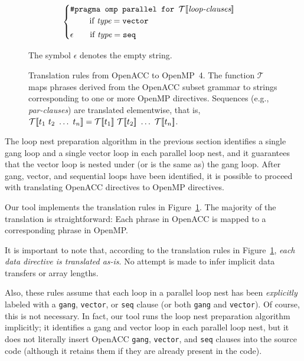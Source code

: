 \documentclass{sig-alternate-05-2015}
\begin{document}
\begin{figure*}
\begin{align*}
\begin{cases}
   \texttt{\#pragma omp parallel for\ }\translate{\textit{loop-clauses}} \\
        \hspace*{2em} \textup{ if $\textit{type} = \texttt{vector}$} \vspace*{.25em} \\
   \epsilon
        \hspace*{1.65em} \textup{ if $\textit{type} = \texttt{seq}$} \\
   \end{cases} \\
%
\end{align*}
\caption{Translation rules from OpenACC to OpenMP~4.  The function
$\mathcal{T}$ maps phrases derived from the OpenACC subset grammar to
strings corresponding to one or more OpenMP directives.  Sequences
(e.g., \textit{par-clauses}) are translated elementwise, that is,
$\translate{t_1\ t_2\ \dots\ t_n} =
\translate{t_1}\ \translate{t_2}\ \dots\ \translate{t_n}$.}
The symbol $\epsilon$ denotes the empty string.
\label{fig:rules}
\end{figure*}

The loop nest preparation algorithm in the previous section identifies a single
gang loop and a single vector loop in each parallel loop nest, and it guarantees
that the vector loop is nested under (or is the same as) the gang loop.  After
gang, vector, and sequential loops have been identified, it is possible to
proceed with translating OpenACC directives to OpenMP directives.

Our tool implements the translation rules in Figure~\ref{fig:rules}.  The
majority of the translation is straightforward: Each phrase in OpenACC is
mapped to a corresponding phrase in OpenMP\@.

It is important to note that, according to the translation rules in
Figure~\ref{fig:rules}, \emph{each data directive is translated as-is}.  No
attempt is made to infer implicit data transfers or array lengths.

Also, these rules assume that each loop in a parallel loop nest has been
\emph{explicitly} labeled with a \texttt{gang}, \texttt{vector}, or
\texttt{seq} clause (or both \texttt{gang} and \texttt{vector}).  Of course,
this is not necessary.  In fact, our tool runs the loop nest preparation
algorithm implicitly; it identifies a gang and vector loop in each parallel
loop nest, but it does not literally insert OpenACC \texttt{gang},
\texttt{vector}, and \texttt{seq} clauses into the source code (although
it retains them if they are already present in the code).
\end{document}
